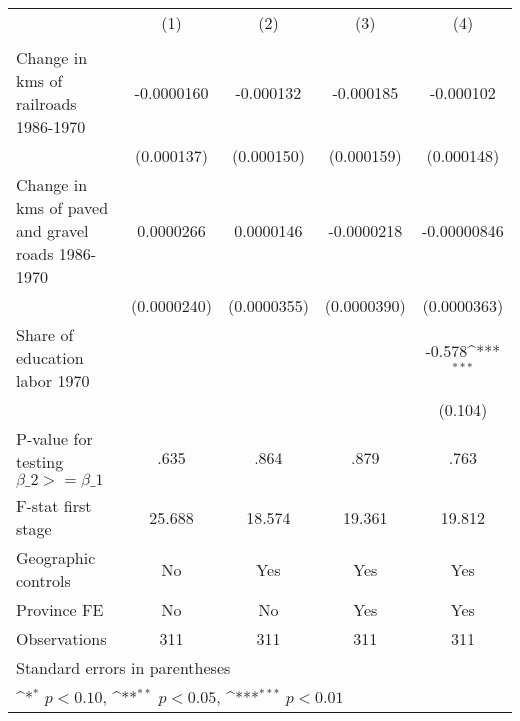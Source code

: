 {
\def\sym#1{\ifmmode^{#1}\else\(^{#1}\)\fi}
\begin{tabular}{l*{4}{c}}
\hline\hline
                &\multicolumn{1}{c}{(1)}&\multicolumn{1}{c}{(2)}&\multicolumn{1}{c}{(3)}&\multicolumn{1}{c}{(4)}\\
                &\multicolumn{1}{c}{}&\multicolumn{1}{c}{}&\multicolumn{1}{c}{}&\multicolumn{1}{c}{}\\
\hline
Change in kms of railroads 1986-1970&-0.0000160         &-0.000132         &-0.000185         &-0.000102         \\
                &(0.000137)         &(0.000150)         &(0.000159)         &(0.000148)         \\
[1em]
Change in kms of paved and gravel roads 1986-1970&0.0000266         &0.0000146         &-0.0000218         &-0.00000846         \\
                &(0.0000240)         &(0.0000355)         &(0.0000390)         &(0.0000363)         \\
[1em]
Share of education labor 1970&                  &                  &                  &   -0.578\sym{***}\\
                &                  &                  &                  &  (0.104)         \\
\hline
P-value for testing $\beta\_{2} >= \beta\_{1}$&     .635         &     .864         &     .879         &     .763         \\
F-stat first stage&   25.688         &   18.574         &   19.361         &   19.812         \\
Geographic controls&       No         &      Yes         &      Yes         &      Yes         \\
Province FE     &       No         &       No         &      Yes         &      Yes         \\
Observations    &      311         &      311         &      311         &      311         \\
\hline\hline
\multicolumn{5}{l}{\footnotesize Standard errors in parentheses}\\
\multicolumn{5}{l}{\footnotesize \sym{*} \(p<0.10\), \sym{**} \(p<0.05\), \sym{***} \(p<0.01\)}\\
\end{tabular}
}
